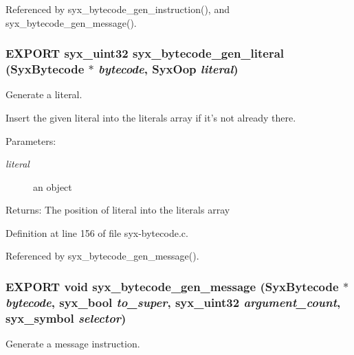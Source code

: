 Referenced by syx\_\-bytecode\_\-gen\_\-instruction(), and syx\_\-bytecode\_\-gen\_\-message().\hypertarget{syx-bytecode_8h_61cd2891a6644ee01481a4d43271efb9}{
\subsubsection{\setlength{\rightskip}{0pt plus 5cm}EXPORT {\bf syx\_\-uint32} syx\_\-bytecode\_\-gen\_\-literal ({\bf SyxBytecode} $\ast$ {\em bytecode}, \/  {\bf SyxOop} {\em literal})}}
\label{syx-bytecode_8h_61cd2891a6644ee01481a4d43271efb9}


Generate a literal.

Insert the given literal into the literals array if it's not already there.

\begin{Desc}
\item[Parameters:]
\begin{description}
\item[{\em literal}]an object \end{description}
\end{Desc}
\begin{Desc}
\item[Returns:]The position of literal into the literals array \end{Desc}


Definition at line 156 of file syx-bytecode.c.

Referenced by syx\_\-bytecode\_\-gen\_\-message().\hypertarget{syx-bytecode_8h_e40b3f23b473b3006cea4818dbdf507d}{
\subsubsection{\setlength{\rightskip}{0pt plus 5cm}EXPORT void syx\_\-bytecode\_\-gen\_\-message ({\bf SyxBytecode} $\ast$ {\em bytecode}, \/  {\bf syx\_\-bool} {\em to\_\-super}, \/  {\bf syx\_\-uint32} {\em argument\_\-count}, \/  {\bf syx\_\-symbol} {\em selector})}}
\label{syx-bytecode_8h_e40b3f23b473b3006cea4818dbdf507d}


Generate a message instruction.

